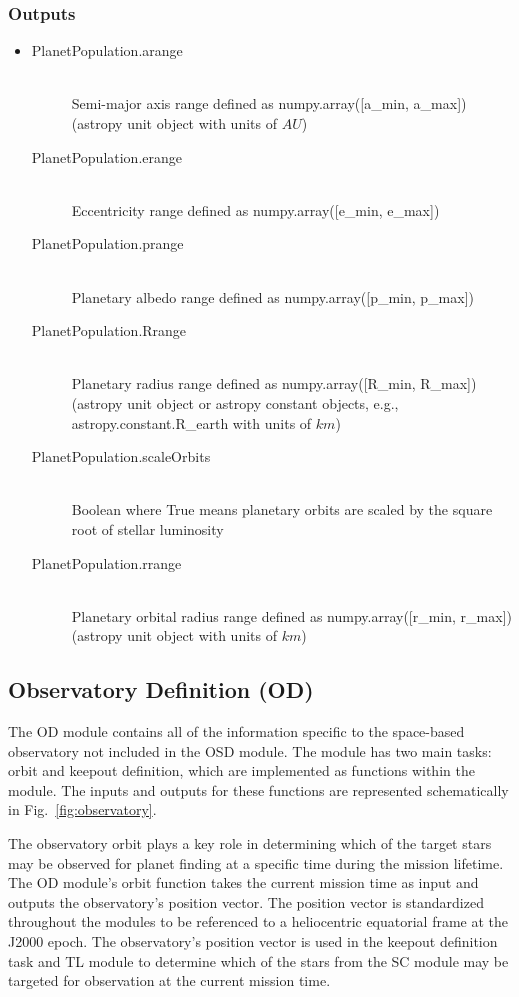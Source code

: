 \documentclass[cleanfoot]{asme2ej}
\begin{document}
\subsubsection*{Outputs}
\begin{itemize}
    \item
    \begin{description}
        \item[PlanetPopulation.arange] \hfill \\
        Semi-major axis range defined as numpy.array([a\_min, a\_max]) (astropy unit object with units of $ AU $)
        \item[PlanetPopulation.erange] \hfill \\
        Eccentricity range defined as numpy.array([e\_min, e\_max])
        \item[PlanetPopulation.prange] \hfill \\
        Planetary albedo range defined as numpy.array([p\_min, p\_max])
        \item[PlanetPopulation.Rrange] \hfill \\
        Planetary radius range defined as numpy.array([R\_min, R\_max]) (astropy unit object or astropy constant objects, e.g., astropy.constant.R\_earth with units of $ km $)
        \item[PlanetPopulation.scaleOrbits] \hfill \\
        Boolean where True means planetary orbits are scaled by the square root of stellar luminosity
        \item[PlanetPopulation.rrange] \hfill \\
        Planetary orbital radius range defined as numpy.array([r\_min, r\_max]) (astropy unit object with units of $ km $)
    \end{description}
\end{itemize}


\subsection{Observatory Definition (OD)}
The OD module contains all of the information specific to the space-based observatory not included in the OSD module. The module has two main tasks: orbit and keepout definition, which are implemented as functions within the module. The inputs and outputs for these functions are represented schematically in Fig.~\ref{fig:observatory}.

The observatory orbit plays a key role in determining which of the target stars may be observed for planet finding at a specific time during the mission lifetime. The OD module's orbit function takes the current mission time as input and outputs the observatory's position vector. The position vector is standardized throughout the modules to be referenced to a heliocentric equatorial frame at the J2000 epoch. The observatory's position vector is used in the keepout definition task and TL module to determine which of the stars from the SC module may be targeted for observation at the current mission time.
\end{document}
